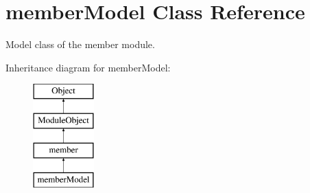 \hypertarget{classmemberModel}{\section{member\+Model Class Reference}
\label{classmemberModel}
}


Model class of the member module.  


Inheritance diagram for member\+Model\+:\begin{figure}[H]
\begin{center}
\leavevmode
\includegraphics[height=4.000000cm]{classmemberModel}
\end{center}
\end{figure}
